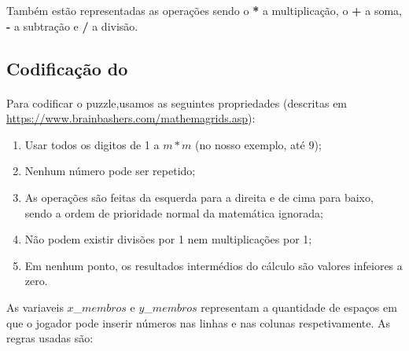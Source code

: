 \documentclass{article}
\begin{document}
Também estão representadas as operações sendo o {\bf{*}} a multiplicação, o  {\bf{+}} a soma, {\bf{-}} a subtração e {\bf{/}} a divisão. 




\subsection{Codificação do {}}
\paragraph{} Para codificar o puzzle,usamos as seguintes propriedades (descritas em {\url{https://www.brainbashers.com/mathemagrids.asp}}):
 \begin{enumerate}
 \item Usar todos os digitos de 1 a $m*m$ (no nosso exemplo, até $9$);
 \item Nenhum número pode ser repetido;
 \item As operações são feitas da esquerda para a direita e de cima para baixo, sendo a ordem de prioridade normal da matemática ignorada;
 \item Não podem existir divisões por 1 nem multiplicações por 1;
\item Em nenhum ponto, os resultados intermédios do cálculo são valores infeiores a zero.
 \end{enumerate}

As variaveis $x$\_$membros$ e $y$\_$membros$ representam a quantidade de espaços em que o jogador pode inserir números nas linhas e nas colunas respetivamente. As regras usadas são:
\end{document}
